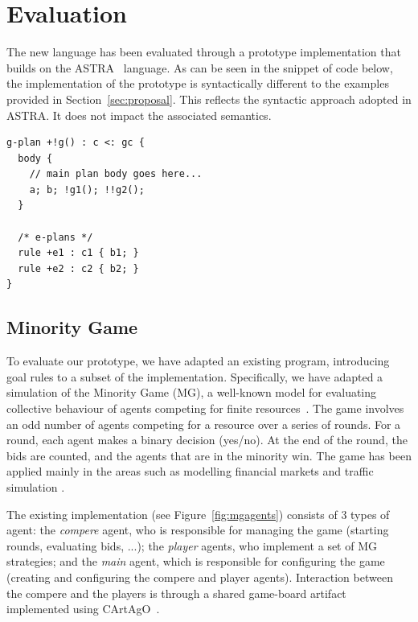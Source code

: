 \section{Evaluation}
\label{sec:evaluation}
The new language has been evaluated through a prototype implementation that builds on 
the ASTRA~\cite{DBLP:conf/prima/CollierRL15} language.  As can be seen in the snippet 
of code below, the implementation of the {\aser} prototype is syntactically different 
to the examples provided in Section~\ref{sec:proposal}. This reflects the syntactic 
approach adopted in ASTRA. It does not impact the associated semantics.

{\small
\begin{verbatim}
g-plan +!g() : c <: gc { 
  body {
    // main plan body goes here...
    a; b; !g1(); !!g2();
  }

  /* e-plans */
  rule +e1 : c1 { b1; }
  rule +e2 : c2 { b2; }
}
\end{verbatim}}

\subsection{Minority Game}
\label{minority}
To evaluate our prototype, we have adapted an existing program, introducing {\aser} goal
rules to a subset of the implementation. Specifically, we have adapted a simulation of
the Minority Game (MG), a well-known model for evaluating collective behaviour of agents competing 
for finite resources~\cite{moro2004minority}. The game involves an odd number of
agents competing for a resource over a series of rounds. For a round, each agent makes a binary
decision (yes/no). At the end of the round, the bids are counted, and the agents that are in the
minority win. The game has been applied mainly in the areas such as modelling financial markets 
\cite{challet2013minority} and traffic simulation \cite{chmura2004minority}.

The existing implementation (see Figure~\ref{fig:mgagents}) consists of 3 types of agent: the 
\emph{compere} agent, who is responsible for managing the game (starting rounds, evaluating bids,
 ...); the \emph{player} agents, who implement a set of MG strategies; and the \emph{main} agent, 
 which is responsible for configuring the game (creating and configuring the compere and player 
 agents). Interaction between the compere and the players is through a shared game-board artifact 
 implemented using CArtAgO~\cite{RicciEPC}.

